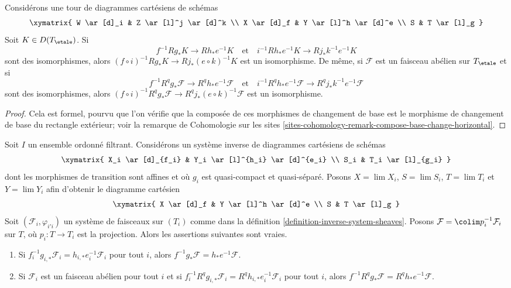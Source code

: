 \begin{lemma}
\label{lemma-base-change-compose}
Considérons une tour de diagrammes cartésiens de schémas
$$
\xymatrix{
W \ar[d]_i & Z \ar[l]^j \ar[d]^k \\
X \ar[d]_f & Y \ar[l]^h \ar[d]^e \\
S & T \ar[l]_g
}
$$
Soit $K \in D(T_\etale)$. Si
$$
f^{-1}Rg_*K \to Rh_*e^{-1}K
\quad\text{et}\quad
i^{-1}Rh_*e^{-1}K \to Rj_*k^{-1}e^{-1}K
$$
sont des isomorphismes, alors
$(f \circ i)^{-1}Rg_*K \to Rj_*(e \circ k)^{-1}K$
est un isomorphisme.
De même, si $\mathcal{F}$ est un faisceau abélien sur $T_\etale$ et si
$$
f^{-1}R^qg_*\mathcal{F} \to R^qh_*e^{-1}\mathcal{F}
\quad\text{et}\quad
i^{-1}R^qh_*e^{-1}\mathcal{F} \to R^qj_*k^{-1}e^{-1}\mathcal{F}
$$
sont des isomorphismes, alors
$(f \circ i)^{-1}R^qg_*\mathcal{F} \to R^qj_*(e \circ k)^{-1}\mathcal{F}$
est un isomorphisme.
\end{lemma}

\begin{proof}
Cela est formel, pourvu que l'on vérifie que la composée de ces
morphismes de changement de base est le morphisme de changement de base
du rectangle extérieur; voir la remarque de Cohomologie sur les sites
\ref{sites-cohomology-remark-compose-base-change-horizontal}.
\end{proof}

\begin{lemma}
\label{lemma-base-change-Rf-star-colim}
Soit $I$ un ensemble ordonné filtrant. Considérons un système inverse de
diagrammes cartésiens de schémas
$$
\xymatrix{
X_i \ar[d]_{f_i} & Y_i \ar[l]^{h_i} \ar[d]^{e_i} \\
S_i & T_i \ar[l]_{g_i}
}
$$
dont les morphismes de transition sont affines et où $g_i$ est quasi-compact et
quasi-séparé. Posons $X = \lim X_i$,
$S = \lim S_i$, $T = \lim T_i$ et $Y = \lim Y_i$ afin
d'obtenir le diagramme cartésien
$$
\xymatrix{
X \ar[d]_f & Y \ar[l]^h \ar[d]^e \\
S & T \ar[l]_g
}
$$
Soit $(\mathcal{F}_i, \varphi_{i'i})$ un système de faisceaux sur
$(T_i)$ comme dans la définition \ref{definition-inverse-system-sheaves}. Posons
$\mathcal{F} = \colim p_i^{-1}\mathcal{F}_i$ sur $T$,
où $p_i : T \to T_i$ est la projection.
Alors les assertions suivantes sont vraies.
\begin{enumerate}
\item Si $f_i^{-1}g_{i, *}\mathcal{F}_i = h_{i, *}e_i^{-1}\mathcal{F}_i$
pour tout $i$, alors
$f^{-1}g_*\mathcal{F} = h_*e^{-1}\mathcal{F}$.
\item Si $\mathcal{F}_i$ est un faisceau abélien pour tout $i$ et si
$f_i^{-1}R^qg_{i, *}\mathcal{F}_i = R^qh_{i, *}e_i^{-1}\mathcal{F}_i$
pour tout $i$, alors
$f^{-1}R^qg_*\mathcal{F} = R^qh_*e^{-1}\mathcal{F}$.
\end{enumerate}
\end{lemma}

